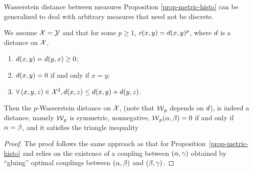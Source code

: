 \begin{rem1}{Wasserstein distance between measures}
Pro\-po\-si\-tion \ref{prop-metric-histo} can be generalized to deal with arbitrary measures that need not be discrete.

\begin{prop}\label{prop-metric-measure}
We assume $\mathcal{X}=\mathcal{Y}$ and that for some $p \geq 1$, $c(x,y)=d(x,y)^p$, where $d$ is a distance on $\mathcal{X}$, \ie
\begin{enumerate}[label=(\roman*)]
	\item  $d(x,y) = d(y,x) \geq 0$;
	\item  $d(x,y)=0$ if and only if $x=y$;
	\item  $\forall \, (x,y,z) \in \mathcal{X}^3, d(x,z) \leq d(x,y)+d(y,z)$.
\end{enumerate}
Then the $p$-Wasserstein distance on $\mathcal{X}$,
(note that $\operatorname{\mathcal{W}}_p$ depends on $d$),  is indeed a distance, namely $\operatorname{\mathcal{W}}_p$ is symmetric, nonnegative, $\operatorname{\mathcal{W}}_p(\alpha,\beta)=0$ if and only if $\alpha = \beta$, and it satisfies the triangle inequality
\end{prop}
\begin{proof}
The proof follows the same approach as that for Proposition~\ref{prop-metric-histo} and relies on the existence of a coupling between $(\alpha,\gamma)$ obtained by ``gluing'' optimal couplings between $(\alpha,\beta)$ and $(\beta,\gamma)$.
\end{proof}
\end{rem1}


